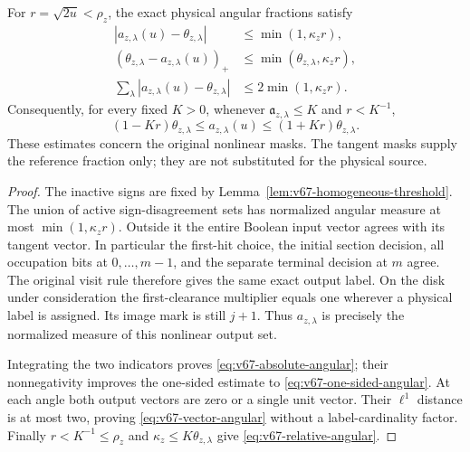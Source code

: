 \begin{theorem}
\label{thm:v67-relative-angular}
For $r=\sqrt{2u}<\rho_z$, the exact physical angular fractions satisfy
\begin{align}
 |a_{z,\lambda}(u)-\theta_{z,\lambda}|
       &\le\min(1,\kappa_zr),                    \label{eq:v67-absolute-angular}\\
 (\theta_{z,\lambda}-a_{z,\lambda}(u))_+
       &\le\min(\theta_{z,\lambda},\kappa_zr),  \label{eq:v67-one-sided-angular}\\
 \sum_\lambda|a_{z,\lambda}(u)-\theta_{z,\lambda}|
       &\le2\min(1,\kappa_zr).                  \label{eq:v67-vector-angular}
\end{align}
Consequently, for every fixed $K>0$, whenever
$\mathfrak a_{z,\lambda}\le K$ and $r<K^{-1}$,
\begin{equation}\label{eq:v67-relative-angular}
 (1-Kr)\theta_{z,\lambda}
       \le a_{z,\lambda}(u)
       \le(1+Kr)\theta_{z,\lambda}.
\end{equation}
These estimates concern the original nonlinear masks. The tangent
masks supply the reference fraction only; they are not substituted
for the physical source.
\end{theorem}
\begin{proof}
The inactive signs are fixed by Lemma~\ref{lem:v67-homogeneous-threshold}.
The union of active sign-disagreement sets has normalized angular
measure at most $\min(1,\kappa_zr)$. Outside it the entire Boolean
input vector agrees with its tangent vector. In particular the first-hit
choice, the initial section decision, all occupation bits at
$0,\ldots,m-1$, and the separate terminal decision at $m$ agree.
The original visit rule therefore gives the same exact output label.
On the disk under consideration the first-clearance multiplier equals
one wherever a physical label is assigned. Its image mark is still
$j+1$. Thus $a_{z,\lambda}$ is precisely the normalized measure of
this nonlinear output set.

Integrating the two indicators proves
\eqref{eq:v67-absolute-angular}; their nonnegativity improves the
one-sided estimate to \eqref{eq:v67-one-sided-angular}. At each angle
both output vectors are zero or a single unit vector. Their $\ell^1$
distance is at most two, proving \eqref{eq:v67-vector-angular} without
a label-cardinality factor. Finally $r<K^{-1}\le\rho_z$ and
$\kappa_z\le K\theta_{z,\lambda}$ give
\eqref{eq:v67-relative-angular}.
\end{proof}

